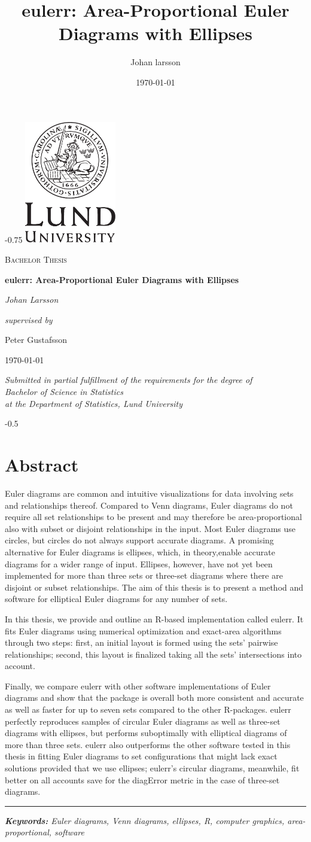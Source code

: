 \documentclass[
  oneside,
  openany,
  numbers=noendperiod,
  parskip=half,
  bibliography=totoc
]{scrbook}\usepackage[]{graphicx}\usepackage{xcolor}
\title{eulerr: Area-Proportional Euler Diagrams with Ellipses}
\author{Johan larsson}
\date{\today}
\renewcommand{\maketitle}{%
  \cleardoublepage
  \begin{addmargin*}[0.25\overhang]{-0.75\overhang}%
    \centering
    \vspace*{2cm}
    \includegraphics[width=0.3\textwidth]{LundUniversity_C2line_BLACK}\par\vspace{1cm}
    \vspace{0.5cm}
    {\scshape\Large Bachelor Thesis \par}
    {\Huge\bfseries eulerr: Area-Proportional Euler Diagrams with Ellipses \par}
    \vspace{2cm}
    {\huge\itshape Johan Larsson \par}
    \vspace{2cm}
    {\Large{\itshape supervised by}\par Peter Gustafsson}
    \vfill
    {\Large \today\par}
    \vfill
    {\large \itshape Submitted in partial fulfillment of the requirements for the degree of\\
      Bachelor of Science in Statistics\\
      at the Department of Statistics, Lund University}
  \end{addmargin*}%
  \thispagestyle{empty}
}
\newlength{\overhang}
\begin{document}
\frontmatter
\maketitle

\begin{addmargin*}[0.5\overhang]{-0.5\overhang}
{\hypersetup{linkcolor=black}
\tableofcontents
}

\chapter*{Abstract}

Euler diagrams are common and intuitive visualizations for data involving
sets and relationships thereof. Compared to Venn diagrams, Euler diagrams do not
require all set relationships to be present and may therefore be area-proportional
also with subset or disjoint relationships in the input.
Most Euler diagrams use circles, but circles do not always
support accurate diagrams. A promising alternative for Euler diagrams is ellipses,
which, in theory,enable accurate diagrams for a wider range
of input. Ellipses, however, have not yet
been implemented for more than three sets or three-set diagrams where
there are disjoint or subset relationships. The aim of this thesis is
to present a method and software for elliptical Euler diagrams for any
number of sets.

In this thesis, we provide and outline an R-based implementation called eulerr.
It fits Euler diagrams using numerical optimization and exact-area
algorithms through two steps: first, an initial layout is formed using
the sets' pairwise relationships; second, this layout is finalized
taking all the sets' intersections into account.

Finally, we compare eulerr with other software implementations of Euler
diagrams and show that the package
is overall both more consistent and accurate as well as
faster for up to seven sets compared to the other R-packages. eulerr perfectly
reproduces samples of circular Euler diagrams as well
as three-set diagrams with ellipses, but performs suboptimally with elliptical
diagrams of more than three sets. eulerr also outperforms the other software tested in
this thesis in fitting Euler diagrams to set configurations that might
lack exact solutions provided that we use ellipses; eulerr's circular diagrams,
meanwhile, fit better
on all accounts save for the diagError metric in the case of three-set diagrams.

\par\noindent\rule{\textwidth}{0.5pt}
\itshape\noindent\textbf{Keywords:} Euler diagrams, Venn diagrams, ellipses, R,
computer graphics, area-proportional, software

\end{addmargin*}
\mainmatter
\end{document}

